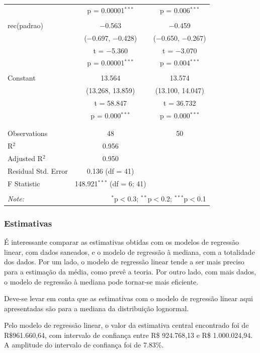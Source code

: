 \documentclass[a4paper, 12pt]{article}
\begin{document}
\begin{table}[!htbp]
\begin{tabular}{@{\extracolsep{5pt}}lcc}
  & p = 0.00001$^{***}$ & p = 0.006$^{***}$ \\ 
  & & \\ 
 rec(padrao) & $-$0.563 & $-$0.459 \\ 
  & ($-$0.697, $-$0.428) & ($-$0.650, $-$0.267) \\ 
  & t = $-$5.360 & t = $-$3.070 \\ 
  & p = 0.00001$^{***}$ & p = 0.004$^{***}$ \\ 
  & & \\ 
 Constant & 13.564 & 13.574 \\ 
  & (13.268, 13.859) & (13.100, 14.047) \\ 
  & t = 58.847 & t = 36.732 \\ 
  & p = 0.000$^{***}$ & p = 0.000$^{***}$ \\ 
  & & \\ 
\hline \\[-1.8ex] 
Observations & 48 & 50 \\ 
R$^{2}$ & 0.956 &  \\ 
Adjusted R$^{2}$ & 0.950 &  \\ 
Residual Std. Error & 0.136 (df = 41) &  \\ 
F Statistic & 148.921$^{***}$ (df = 6; 41) &  \\ 
\hline 
\hline \\[-1.8ex] 
\textit{Note:}  & \multicolumn{2}{r}{$^{*}$p$<$0.3; $^{**}$p$<$0.2; $^{***}$p$<$0.1} \\ 
\end{tabular} 
\end{table}

\hypertarget{estimativas}{%
\subsubsection{Estimativas}\label{estimativas}}

É interessante comparar as estimativas obtidas com os modelos de
regressão linear, com dados saneados, e o modelo de regressão à mediana,
com a totalidade dos dados. Por um lado, o modelo de regressão linear
tende a ser mais preciso para a estimação da média, como prevê a teoria.
Por outro lado, com mais dados, o modelo de regressão à mediana pode
tornar-se mais eficiente.

Deve-se levar em conta que as estimativas com o modelo de regressão
linear aqui apresentadas são para a mediana da distribuição lognormal.

Pelo modelo de regressão linear, o valor da estimativa central
encontrado foi de R\$961.660,64, com intervalo de confiança entre R\$
924.768,13 e R\$ 1.000.024,94. A amplitude do intervalo de confiança foi
de 7.83\%.
\end{document}
